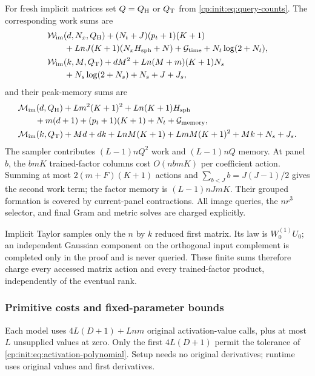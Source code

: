 For fresh implicit matrices set $Q=Q_{\rm H}$ or $Q_{\rm T}$ from
\eqref{cp:init:eq:query-counts}. The corresponding work sums are
\begin{align}
&\mathcal W_{\rm im}(d,N_x,Q_{\rm H})+(N_t+J)(p_t+1)(K+1)\nonumber\\
&\qquad+LnJ(K+1)(N_xH_{\rm sph}+N)
 +\mathcal G_{\rm time}+N_t\log(2+N_t),
\label{cp:init:eq:implicit-harmonic-work}\\
&\mathcal W_{\rm im}(k,M,Q_{\rm T})+dM^2
 +Ln(M+m)(K+1)N_s\nonumber\\
&\qquad+N_s\log(2+N_s)+N_s+J+J_s,
\label{cp:init:eq:implicit-taylor-work}
\end{align}
and their peak-memory sums are
\begin{align}
&\mathcal M_{\rm im}(d,Q_{\rm H})+Lm^2(K+1)^2+Ln(K+1)H_{\rm sph}\nonumber\\
&\qquad+m(d+1)+(p_t+1)(K+1)+N_t+\mathcal G_{\rm memory},
\label{cp:init:eq:implicit-harmonic-memory}\\
&\mathcal M_{\rm im}(k,Q_{\rm T})+Md+dk+LnM(K+1)
 +LmM(K+1)^2+Mk+N_s+J_s.
\label{cp:init:eq:implicit-taylor-memory}
\end{align}
The sampler contributes $(L-1)nQ^2$ work and $(L-1)nQ$ memory.
At panel $b$, the $bmK$ trained-factor columns cost $O(nbmK)$
per coefficient action. Summing at most $2(m+F)(K+1)$ actions
and $\sum_{b<J}b=J(J-1)/2$ gives the second work term;
the factor memory is $(L-1)nJmK$. Their grouped formation is
covered by current-panel contractions. All image queries, the $nr^3$
selector, and final Gram and metric solves are charged explicitly.

Implicit Taylor samples only the $n$ by $k$ reduced first matrix.
Its law is $W_0^{(1)}U_0$; an independent Gaussian component on the
orthogonal input complement is completed only in the proof and is never
queried. These finite sums therefore charge every accessed matrix action
and every trained-factor product, independently of the eventual rank.

\subsubsection{Primitive costs and fixed-parameter bounds}
\label{cp:init:sec:specialization}

Each model uses $4L(D+1)+Lnm$ original activation-value calls,
plus at most $L$ unsupplied values at zero. Only the first $4L(D+1)$
permit the tolerance of \eqref{cp:init:eq:activation-polynomial}.
Setup needs no original derivatives; runtime uses original values and
first derivatives.


